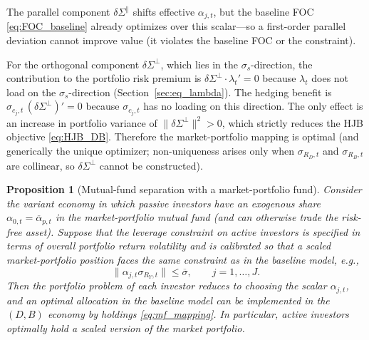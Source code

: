 \documentclass[11pt,english]{article}
\newtheorem{prop}{Proposition}
\begin{document}
The parallel component $\delta\Sigma^{\parallel}$ shifts effective $\alpha_{j,t}$, but the baseline FOC \eqref{eq:FOC_baseline} already optimizes over this scalar---so a first-order parallel deviation cannot improve value (it violates the baseline FOC or the constraint).

For the orthogonal component $\delta\Sigma^{\perp}$, which lies in the $\sigma_s$-direction, the contribution to the portfolio risk premium is $\delta\Sigma^{\perp}\cdot\lambda_t'=0$ because $\lambda_t$ does not load on the $\sigma_s$-direction (Section~\ref{sec:eq_lambda}). The hedging benefit is $\sigma_{c_j,t}\,(\delta\Sigma^{\perp})'=0$ because $\sigma_{c_j,t}$ has no loading on this direction. The only effect is an increase in portfolio variance of $\|\delta\Sigma^{\perp}\|^2>0$, which strictly reduces the HJB objective \eqref{eq:HJB_DB}. Therefore the market-portfolio mapping is optimal (and generically the unique optimizer; non-uniqueness arises only when $\sigma_{R_D,t}$ and $\sigma_{R_B,t}$ are collinear, so $\delta\Sigma^{\perp}$ cannot be constructed).

\begin{prop}[Mutual-fund separation with a market-portfolio fund]\label{prop:mf_separation}
Consider the variant economy in which passive investors have an exogenous share $\alpha_{0,t}=\overline{\alpha}_{p,t}$ in the market-portfolio mutual fund (and can otherwise trade the risk-free asset). Suppose that the leverage constraint on active investors is specified in terms of overall portfolio return volatility and is calibrated so that a scaled market-portfolio position faces the same constraint as in the baseline model, e.g.,
\[
    \|\alpha_{j,t}\sigma_{R_Y,t}\|\le \overline{\sigma},
    \qquad j=1,\ldots,J.
\]
Then the portfolio problem of each investor reduces to choosing the scalar $\alpha_{j,t}$, and an optimal allocation in the baseline model can be implemented in the $(D,B)$ economy by holdings \eqref{eq:mf_mapping}. In particular, active investors optimally hold a scaled version of the market portfolio.
\end{prop}
\end{document}
